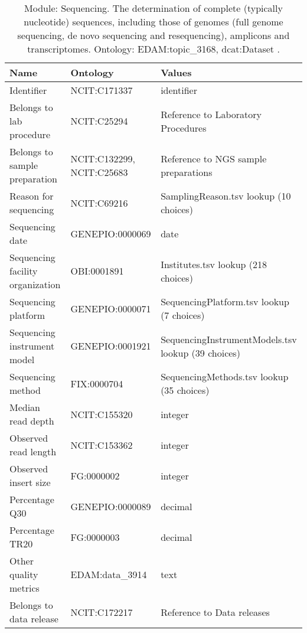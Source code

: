 \documentclass{article}
\begin{document}
\begin{table}[htb]
\begin{tabular}{lll}
Name & Ontology & Values \\
\hline
Identifier & NCIT:C171337  & identifier \\
Belongs to lab procedure & NCIT:C25294  & Reference to Laboratory Procedures \\
Belongs to sample preparation & NCIT:C132299, NCIT:C25683  & Reference to NGS sample preparations \\
Reason for sequencing & NCIT:C69216  & SamplingReason.tsv lookup (10 choices) \\
Sequencing date & GENEPIO:0000069  & date \\
Sequencing facility organization & OBI:0001891  & Institutes.tsv lookup (218 choices) \\
Sequencing platform & GENEPIO:0000071  & SequencingPlatform.tsv lookup (7 choices) \\
Sequencing instrument model & GENEPIO:0001921  & SequencingInstrumentModels.tsv lookup (39 choices) \\
Sequencing method & FIX:0000704  & SequencingMethods.tsv lookup (35 choices) \\
Median read depth & NCIT:C155320  & integer \\
Observed read length & NCIT:C153362  & integer \\
Observed insert size & FG:0000002  & integer \\
Percentage Q30 & GENEPIO:0000089  & decimal \\
Percentage TR20 & FG:0000003  & decimal \\
Other quality metrics & EDAM:data\_3914  & text \\
Belongs to data release & NCIT:C172217  & Reference to Data releases \\
\hline
\end{tabular}
\caption[Module: Sequencing]{\label{table:table10} Module: Sequencing. The determination of complete (typically nucleotide) sequences, including those of genomes (full genome sequencing, de novo sequencing and resequencing), amplicons and transcriptomes. Ontology: EDAM:topic\_3168, dcat:Dataset . }
\end{table}
\end{document}
